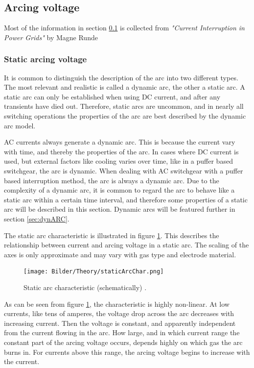 \documentclass[10pt,b5paper,twoside]{article}
\begin{document}
\newpage
\subsection{Arcing voltage} \label{sec:arcingVoltageAllSEC}
Most of the information in section \ref{sec:arcingVoltageAllSEC} is collected from \textit{"Current Interruption in Power Grids"} by Magne Runde \cite{bib:HVEbreak} \newline

\subsubsection{Static arcing voltage} \label{sec:staticArcVoltage}
It is common to distinguish the description of the arc into two different types. The most relevant and realistic is called a dynamic arc, the other a static arc. A static arc can only be established when using DC current, and after any transients have died out. Therefore, static arcs are uncommon, and in nearly all switching operations the properties of the arc are best described by the dynamic arc model.

AC currents always generate a dynamic arc. This is because the current vary with time, and thereby the properties of the arc. In cases where DC current is used, but external factors like cooling varies over time, like in a puffer based switchgear, the arc is dynamic. When dealing with AC switchgear with a puffer based interruption method, the arc is always a dynamic arc. Due to the complexity of a dynamic arc, it is common to regard the arc to behave like a static arc within a certain time interval, and therefore some properties of a static arc will be described in this section. Dynamic arcs will be featured further in section \ref{sec:dynARC}.

The static arc characteristic is illustrated in figure \ref{fig:staticArcChar}. This describes the relationship between current and arcing voltage in a static arc. The scaling of the axes is only approximate and may vary with gas type and electrode material.

\begin{figure}[H]
\centering
\texttt{[image: Bilder/Theory/staticArcChar.png]}
\caption{Static arc characteristic (schematically) \cite{bib:HVEbreak}.} \label{fig:staticArcChar}
\end{figure}

As can be seen from figure \ref{fig:staticArcChar}, the characteristic is highly non-linear. At low currents, like tens of amperes, the voltage drop across the arc decreases with increasing current. Then the voltage is constant, and apparently independent from the current flowing in the arc. How large, and in which current range the constant part of the arcing voltage occurs, depends highly on which gas the arc burns in. For currents above this range, the arcing voltage begins to increase with the current.
\end{document}
